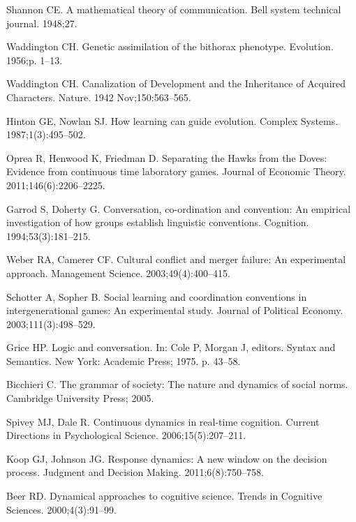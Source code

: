 \documentclass[10pt,letterpaper]{article}
\begin{document}
\begin{thebibliography}{10}
Shannon CE.
\newblock A mathematical theory of communication.
\newblock Bell system technical journal. 1948;27.

Waddington CH.
\newblock Genetic assimilation of the bithorax phenotype.
\newblock Evolution. 1956;p. 1--13.

Waddington CH.
\newblock Canalization of Development and the Inheritance of Acquired
  Characters.
\newblock Nature. 1942 Nov;150:563--565.

Hinton GE, Nowlan SJ.
\newblock How learning can guide evolution.
\newblock Complex Systems. 1987;1(3):495--502.

Oprea R, Henwood K, Friedman D.
\newblock Separating the Hawks from the Doves: Evidence from continuous time
  laboratory games.
\newblock Journal of Economic Theory. 2011;146(6):2206--2225.

Garrod S, Doherty G.
\newblock Conversation, co-ordination and convention: An empirical
  investigation of how groups establish linguistic conventions.
\newblock Cognition. 1994;53(3):181--215.

Weber RA, Camerer CF.
\newblock Cultural conflict and merger failure: An experimental approach.
\newblock Management Science. 2003;49(4):400--415.

Schotter A, Sopher B.
\newblock Social learning and coordination conventions in intergenerational
  games: An experimental study.
\newblock Journal of Political Economy. 2003;111(3):498--529.

Grice HP.
\newblock Logic and conversation.
\newblock In: Cole P, Morgan J, editors. Syntax and Semantics. New York:
  Academic Press; 1975. p. 43--58.

Bicchieri C.
\newblock The grammar of society: The nature and dynamics of social norms.
\newblock Cambridge University Press; 2005.

Spivey MJ, Dale R.
\newblock Continuous dynamics in real-time cognition.
\newblock Current Directions in Psychological Science. 2006;15(5):207--211.

Koop GJ, Johnson JG.
\newblock Response dynamics: A new window on the decision process.
\newblock Judgment and Decision Making. 2011;6(8):750--758.

Beer RD.
\newblock Dynamical approaches to cognitive science.
\newblock Trends in Cognitive Sciences. 2000;4(3):91--99.

\end{thebibliography}

\end{document}
